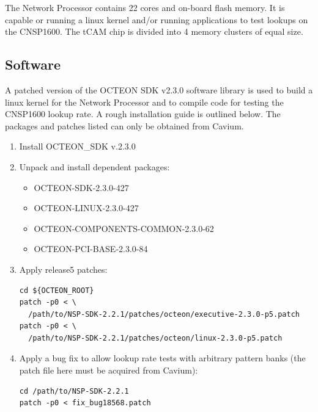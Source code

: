 \documentclass[preprint,prd,showpacs]{revtex4-1}
\begin{document}
The Network Processor contains 22 cores and on-board flash memory. It is capable or running a linux kernel and/or running applications to test lookups on the CNSP1600. The tCAM chip is divided into 4 memory clusters of equal size.

\subsection{Software}

A patched version of the OCTEON SDK v2.3.0 software library is used to build a linux kernel for the Network Processor and to compile code for testing the CNSP1600 lookup rate. A rough installation guide is outlined below. The packages and patches listed can only be obtained from Cavium.
\begin{enumerate}
\item Install OCTEON\_SDK v.2.3.0
\item Unpack and install dependent packages:
  \begin{itemize}
  \item OCTEON-SDK-2.3.0-427
  \item OCTEON-LINUX-2.3.0-427
  \item OCTEON-COMPONENTS-COMMON-2.3.0-62
  \item OCTEON-PCI-BASE-2.3.0-84
  \end{itemize}
\item Apply release5 patches:
  \begin{lstlisting}
cd ${OCTEON_ROOT}
patch -p0 < \
  /path/to/NSP-SDK-2.2.1/patches/octeon/executive-2.3.0-p5.patch
patch -p0 < \
  /path/to/NSP-SDK-2.2.1/patches/octeon/linux-2.3.0-p5.patch
  \end{lstlisting}
\item Apply a bug fix to allow lookup rate tests with arbitrary pattern banks (the patch file here must be acquired from Cavium):
  \begin{lstlisting}
cd /path/to/NSP-SDK-2.2.1
patch -p0 < fix_bug18568.patch
  \end{lstlisting}
\end{enumerate}
\end{document}
